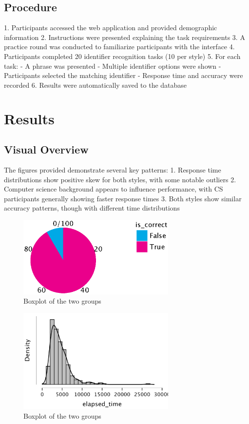 \documentclass[unicode,11pt,a4paper,oneside,numbers=endperiod,openany]{scrartcl}
\begin{document}
\subsection{Procedure}
1. Participants accessed the web application and provided demographic information
2. Instructions were presented explaining the task requirements
3. A practice round was conducted to familiarize participants with the interface
4. Participants completed 20 identifier recognition tasks (10 per style)
5. For each task:
   - A phrase was presented
   - Multiple identifier options were shown
   - Participants selected the matching identifier
   - Response time and accuracy were recorded
6. Results were automatically saved to the database


\section{Results}

\subsection{Visual Overview}

The figures provided demonstrate several key patterns:
1. Response time distributions show positive skew for both styles, with some notable outliers
2. Computer science background appears to influence performance, with CS participants generally showing faster response times
3. Both styles show similar accuracy patterns, though with different time distributions

\begin{figure}[h]
    \centering
    \includegraphics[width=0.7\textwidth]{./figures/correct_camel_background.eps}
    \caption{Boxplot of the two groups}
    \label{fig:boxplot}
\end{figure}

\begin{figure}[h]
    \centering
    \includegraphics[width=0.7\textwidth]{./figures/correct_camel_distr.png}
    \caption{Boxplot of the two groups}
    \label{fig:boxplot}
\end{figure}
\end{document}
